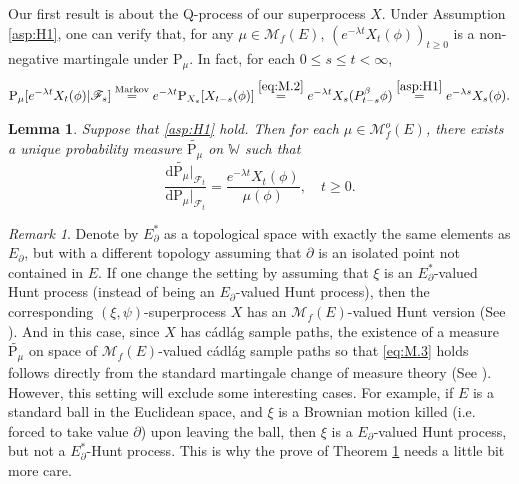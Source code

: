 \documentclass[12pt,a4paper]{amsart}
\numberwithin{equation}{section}
\theoremstyle{plain}
\newtheorem{lem}[thm]{Lemma}
\theoremstyle{definition}
\theoremstyle{remark}
\newtheorem{remark}{Remark}
\begin{document}
	Our first result is about the Q-process of our superprocess $X$.
	Under Assumption \eqref{asp:H1}, one can verify that, for any $\mu \in \mathcal M_f(E)$, $(e^{-\lambda t}  X_t(\phi))_{t\geq 0}$ is a non-negative martingale under $\mathrm P_\mu$.
	In fact, for each $0\leq s\leq t< \infty$,
\begin{equation} \label{eq:M.25}
	\mathrm P_\mu[e^{-\lambda t}X_t(\phi)|\mathscr F_s]
	\overset{\text{Markov}} = e^{-\lambda t} \mathrm P_{X_s}[X_{t-s}(\phi)]
	\overset{\eqref{eq:M.2}}= e^{-\lambda t}X_s(P_{t-s}^\beta \phi)
	\overset{\eqref{asp:H1}}=e^{-\lambda s}X_s(\phi).
\end{equation}
	\begin{lem} \label{thm:T}
	Suppose that \eqref{asp:H1} hold. Then for each $\mu \in \mathcal M_f^o(E)$, 
	there exists a unique probability measure $\widetilde {\mathrm P_\mu}$
	on $\mathbb W$ such that
\begin{equation} \label{eq:M.3}
	\frac{{\mathrm d}\widetilde{\mathrm P_\mu}|_{\mathscr F_t}}
	{{\mathrm d}\mathrm P_\mu|_{\mathscr F_t}}
	=\frac{e^{-\lambda t}X_t(\phi)}{\mu(\phi) },
	\quad t\geq 0.
\end{equation}
\end{lem}

\begin{remark}
	Denote by $E_\partial^*$ as a topological space with exactly the same elements as $E_\partial$, but with a different topology assuming that $\partial$ is an isolated point not contained in $E$.
	If one change the setting by assuming that $\xi$ is an $E_\partial^*$-valued Hunt process (instead of being an $E_\partial$-valued Hunt process), then the corresponding $(\xi,\psi)$-superprocess $X$ has an $\mathcal M_f(E)$-valued Hunt version (See \cite[Theorem 5.12]{Li2011Measure-valued}).
	And in this case, since $X$ has c\'adl\'ag sample paths, the existence of a measure $\widetilde {\mathrm P_\mu}$ on space of $\mathcal M_f(E)$-valued c\'adl\'ag sample paths so that \eqref{eq:M.3} holds follows directly from the standard martingale change of measure theory (See \cite[Lemma 18.18]{Kallenberg2002Foundations}).
	However, this setting will exclude some interesting cases. For example, if $E$ is a standard ball in the Euclidean space, and $\xi$ is a Brownian motion killed (i.e. forced to take value $\partial$) upon leaving the ball, then $\xi$ is a $E_\partial$-valued Hunt process, but not a $E_\partial^*$-Hunt process.
	This is why the prove of Theorem \ref{thm:T} needs a little bit more care. 
\end{remark}
\end{document}
